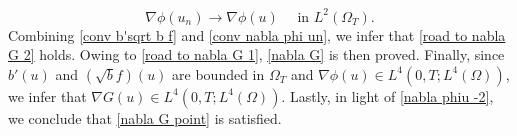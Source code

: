 \documentclass[11pt,  reqno]{amsart}%
\theoremstyle{plain}
\theoremstyle{definition}
\theoremstyle{remark}
\numberwithin{equation}{section}
\newcommand{\dx}{\textup{d}x}
\newcommand{\dt}{\textup{d}t}
\begin{document}
\begin{equation}
    \label{conv nabla phi un}
    \nabla \phi(u_n) \to \nabla \phi(u) \quad \mbox{ in }L^2( \Omega_T ).
\end{equation}
Combining \eqref{conv b'sqrt b f} and \eqref{conv nabla phi un}, we infer that \eqref{road to nabla G 2} holds. Owing to \eqref{road to nabla G 1}, \eqref{nabla G} is then proved. Finally, since $b'(u)$ and $(\sqrt{b}f)(u)$ are bounded in $\Omega_T$ and $\nabla \phi(u) \in L^4(0,T; L^4(\Omega))$, we infer that $\nabla G(u) \in L^4(0,T; L^4(\Omega))$. Lastly, in light of \eqref{nabla phiu -2}, we conclude that \eqref{nabla G point} is satisfied.
\end{document}

